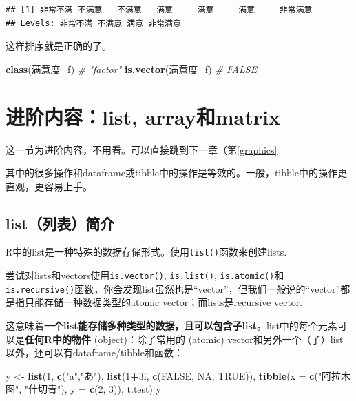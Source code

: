 \documentclass[]{book}
\newenvironment{Shaded}{\begin{snugshade}}{\end{snugshade}}
\newcommand{\CommentTok}[1]{\textcolor[rgb]{0.56,0.35,0.01}{\textit{#1}}}
\newcommand{\DataTypeTok}[1]{\textcolor[rgb]{0.13,0.29,0.53}{#1}}
\newcommand{\DecValTok}[1]{\textcolor[rgb]{0.00,0.00,0.81}{#1}}
\newcommand{\KeywordTok}[1]{\textcolor[rgb]{0.13,0.29,0.53}{\textbf{#1}}}
\newcommand{\NormalTok}[1]{#1}
\newcommand{\OperatorTok}[1]{\textcolor[rgb]{0.81,0.36,0.00}{\textbf{#1}}}
\newcommand{\OtherTok}[1]{\textcolor[rgb]{0.56,0.35,0.01}{#1}}
\newcommand{\StringTok}[1]{\textcolor[rgb]{0.31,0.60,0.02}{#1}}
\begin{document}
\begin{verbatim}
## [1] 非常不满 不满意   不满意   满意     满意     满意     非常满意
## Levels: 非常不满 不满意 满意 非常满意
\end{verbatim}

这样排序就是正确的了。

\begin{Shaded}
\begin{Highlighting}[]
\KeywordTok{class}\NormalTok{(满意度_f) }\CommentTok{# "factor"}
\KeywordTok{is.vector}\NormalTok{(满意度_f) }\CommentTok{# FALSE}
\end{Highlighting}
\end{Shaded}

\hypertarget{list-arraymatrix}{%
\section{进阶内容：list, array和matrix}\label{list-arraymatrix}}

这一节为进阶内容，不用看。可以直接跳到下一章（第\ref{graphics}

其中的很多操作和dataframe或tibble中的操作是等效的。一般，tibble中的操作更直观，更容易上手。

\hypertarget{list}{%
\subsection{list（列表）简介}\label{list}}

R中的list是一种特殊的数据存储形式。使用\texttt{list()}函数来创建lists.

尝试对lists和vectors使用\texttt{is.vector()}, \texttt{is.list()}, \texttt{is.atomic()}和\texttt{is.recursive()}函数，你会发现list虽然也是``vector''，但我们一般说的``vector''都是指只能存储一种数据类型的atomic vector；而lists是recursive vector.

这意味着\textbf{一个list能存储多种类型的数据，且可以包含子list}。list中的每个元素可以是\textbf{任何R中的物件} (object)：除了常用的 (atomic) vector和另外一个（子）list以外，还可以有dataframe/tibble和函数：

\begin{Shaded}
\begin{Highlighting}[]
\NormalTok{y <-}\StringTok{ }\KeywordTok{list}\NormalTok{(}\DecValTok{1}\NormalTok{, }\KeywordTok{c}\NormalTok{(}\StringTok{"a"}\NormalTok{,}\StringTok{"あ"}\NormalTok{), }\KeywordTok{list}\NormalTok{(}\DecValTok{1}\OperatorTok{+}\NormalTok{3i, }\KeywordTok{c}\NormalTok{(}\OtherTok{FALSE}\NormalTok{, }\OtherTok{NA}\NormalTok{, }\OtherTok{TRUE}\NormalTok{)), }
          \KeywordTok{tibble}\NormalTok{(}\DataTypeTok{x =} \KeywordTok{c}\NormalTok{(}\StringTok{"阿拉木图"}\NormalTok{, }\StringTok{"什切青"}\NormalTok{), }\DataTypeTok{y =} \KeywordTok{c}\NormalTok{(}\DecValTok{2}\NormalTok{, }\DecValTok{3}\NormalTok{)),}
\NormalTok{          t.test)}
\NormalTok{y}
\end{Highlighting}
\end{Shaded}
\end{document}

